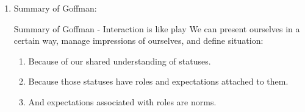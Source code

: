 \documentclass[12pt,a4paper]{article}
\begin{document}
\begin{enumerate}
\begin{enumerate}
		\begin{enumerate}
			\item For interactions to be successful, people must agree about the definition of the situation. 
			\item Must agree on statuses and roles for particular context. 
			\item Definition: 
			\begin{df}{Working Consensus}
				Together the participants contribute to a single overall-definition of the situation, which involves: 
				\begin{enumerate}
					\item Not so much real agreement as to what exists.
					\item But rather real agreement as to whose "definition" will be honored in that situation. 
				\end{enumerate}
			\end{df}
		\end{enumerate}
		\item Summary of Goffman: 
		\begin{rmk}{Summary of Goffman - Interaction is like play}
			We can present ourselves in a certain way, manage impressions of ourselves, and define situation:
			\begin{enumerate}
				\item Because of our shared understanding of statuses. 
				\item Because those statuses have roles and expectations attached to them.
				\item And expectations associated with roles are norms. 
			\end{enumerate}
		\end{rmk}
	\end{enumerate}
\end{enumerate}
\end{document}
